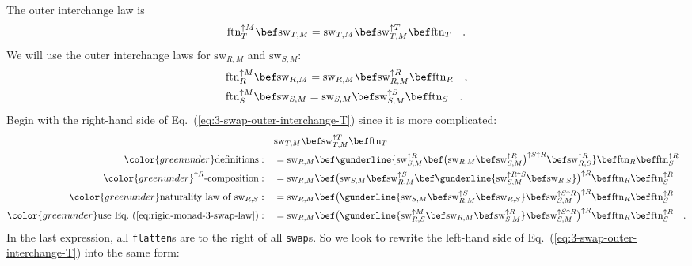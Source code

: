 The outer interchange law is
\begin{equation}
\text{ftn}_{T}^{\uparrow M}\bef\text{sw}_{T,M}=\text{sw}_{T,M}\bef\text{sw}_{T,M}^{\uparrow T}\bef\text{ftn}_{T}\quad.\label{eq:3-swap-outer-interchange-T}
\end{equation}
We will use the outer interchange laws for $\text{sw}_{R,M}$ and
$\text{sw}_{S,M}$:
\begin{align}
 & \text{ftn}_{R}^{\uparrow M}\bef\text{sw}_{R,M}=\text{sw}_{R,M}\bef\text{sw}_{R,M}^{\uparrow R}\bef\text{ftn}_{R}\quad,\label{eq:3-swap-outer-interchange-R}\\
 & \text{ftn}_{S}^{\uparrow M}\bef\text{sw}_{S,M}=\text{sw}_{S,M}\bef\text{sw}_{S,M}^{\uparrow S}\bef\text{ftn}_{S}\quad.\label{eq:3-swap-outer-interchange-S}
\end{align}
Begin with the right-hand side of Eq.~(\ref{eq:3-swap-outer-interchange-T})
since it is more complicated:
\begin{align*}
 & \text{sw}_{T,M}\bef\text{sw}_{T,M}^{\uparrow T}\bef\text{ftn}_{T}\\
{\color{greenunder}\text{definitions}:}\quad & =\text{sw}_{R,M}\bef\gunderline{\text{sw}_{S,M}^{\uparrow R}\bef\big(\text{sw}_{R,M}\bef\text{sw}_{S,M}^{\uparrow R}\big)^{\uparrow S\uparrow R}\bef\text{sw}_{R,S}^{\uparrow R}}\bef\text{ftn}_{R}\bef\text{ftn}_{S}^{\uparrow R}\\
{\color{greenunder}^{\uparrow R}\text{-composition}:}\quad & =\text{sw}_{R,M}\bef\big(\text{sw}_{S,M}\bef\text{sw}_{R,M}^{\uparrow S}\bef\gunderline{\text{sw}_{S,M}^{\uparrow R\uparrow S}\bef\text{sw}_{R,S}}\big)^{\uparrow R}\bef\text{ftn}_{R}\bef\text{ftn}_{S}^{\uparrow R}\\
{\color{greenunder}\text{naturality law of }\text{sw}_{R,S}:}\quad & =\text{sw}_{R,M}\bef\big(\gunderline{\text{sw}_{S,M}\bef\text{sw}_{R,M}^{\uparrow S}\bef\text{sw}_{R,S}}\bef\text{sw}_{S,M}^{\uparrow S\uparrow R}\big)^{\uparrow R}\bef\text{ftn}_{R}\bef\text{ftn}_{S}^{\uparrow R}\\
{\color{greenunder}\text{use Eq.~(\ref{eq:rigid-monad-3-swap-law})}:}\quad & =\text{sw}_{R,M}\bef\big(\gunderline{\text{sw}_{R,S}^{\uparrow M}\bef\text{sw}_{R,M}\bef\text{sw}_{S,M}^{\uparrow R}}\bef\text{sw}_{S,M}^{\uparrow S\uparrow R}\big)^{\uparrow R}\bef\text{ftn}_{R}\bef\text{ftn}_{S}^{\uparrow R}\quad.
\end{align*}
In the last expression, all \lstinline!flatten!s are to the right
of all \lstinline!swap!s. So we look to rewrite the left-hand side
of Eq.~(\ref{eq:3-swap-outer-interchange-T}) into the same form:
